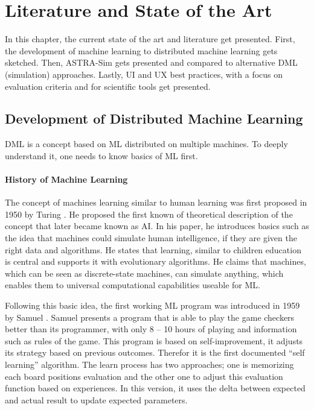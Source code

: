 
\chapter{Literature and State of the Art} %
\label{chap:literature}
In this chapter, the current state of the art and literature get presented.
First, the development of machine learning to distributed machine learning gets sketched. Then, \ac{ASTRA-Sim} gets presented and compared to alternative \ac{DML} (simulation) approaches.
Lastly, \ac{UI} and \ac{UX} best practices, with a focus on evaluation criteria and  for scientific tools get presented. 

\section{Development of Distributed Machine Learning}
\ac{DML} is a concept based on \ac{ML} distributed on multiple machines. To deeply understand it, one needs to know basics of \ac{ML} first.

\subsubsection*{History of Machine Learning}
The concept of machines learning similar to human learning was first proposed in 1950 by Turing \cite{turing_computing_1989}. He proposed the first known of theoretical description of the concept that later became known as \ac{AI}.
In his paper, he introduces basics such as the idea that machines could simulate human intelligence, if they are given the right data and algorithms. He states that learning, similar to children education is central and supports it with evolutionary algorithms. He claims that machines, which can be seen as discrete-state machines, can simulate anything, which enables them to universal computational capabilities useable for \ac{ML}.

Following this basic idea, the first working \ac{ML} program was introduced in 1959 by Samuel \cite{samuel_studies_1959}. Samuel presents a program that is able to play the game checkers better than its programmer, with only 8 -- 10 hours of playing and information such as rules of the game. This program is based on self-improvement, it adjusts its strategy based on previous outcomes. Therefor it is the first documented ``self learning'' algorithm. The learn process has two approaches; one is memorizing each board positions evaluation and the other one to adjust this evaluation function based on experiences.  In this version, it uses the delta between expected and actual result to update expected parameters.

